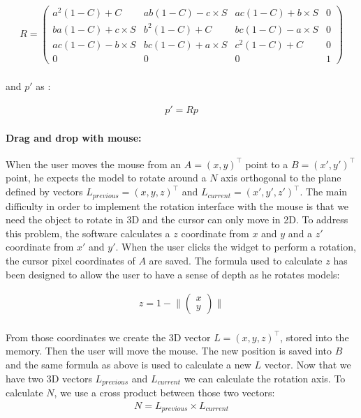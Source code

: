 \documentclass[12pt]{report}
\newcommand{\norm}[1]{\lVert#1\rVert}
\begin{document}
\begin{gather}
R = \begin{pmatrix}
a^2(1-C) + C&   ab(1-C) - c \times S& ac(1-C) + b \times S& 0\\
ba(1-C) + c \times S& b^2(1-C) + C&   bc(1-C) - a \times S& 0\\
ac(1-C) - b \times S& bc(1-C) + a \times S& c^2(1-C) + C& 0\\
0& 0& 0& 1
\end{pmatrix}
\end{gather}

\paragraph{}
	and $p'$ as :

\begin{gather}
p' = R p
\end{gather}


\paragraph{Drag and drop with mouse:}
	When the user moves the mouse from an $A=(x,y)^\top$ point to a $B=(x',y')^\top$ point, he expects the model to rotate around a $N$ axis orthogonal to the plane defined by vectors $L_{previous}=(x,y,z)^\top$ and $L_{current}=(x',y',z')^\top$. The main difficulty in order to implement the rotation interface with the mouse is that we need the object to rotate in 3D and the cursor can only move in 2D. To address this problem, the software calculates a $z$ coordinate from $x$ and $y$ and a $z'$ coordinate from $x'$ and $y'$. When the user clicks the widget to perform a rotation, the cursor pixel coordinates of $A$ are saved. The formula used to calculate $z$ has been designed to allow the user to have a sense of depth as he rotates models:

\begin{gather}
z = 1 - \norm{\left( \begin{array}{cc}
x \\
y \end{array} \right)}
\end{gather}

\paragraph{}
	From those coordinates we create the 3D vector $L=(x,y,z)^\top$, stored into the memory. Then the user will move the mouse. The new position is saved into $B$ and the same formula as above is used to calculate a new $L$ vector.
	Now that we have two 3D vectors $L_{previous}$ and $L_{current}$ we can calculate the rotation axis. To calculate $N$, we use a cross product between those two vectors:
\begin{gather}
N = L_{previous} \times L_{current}
\end{gather}
\end{document}
